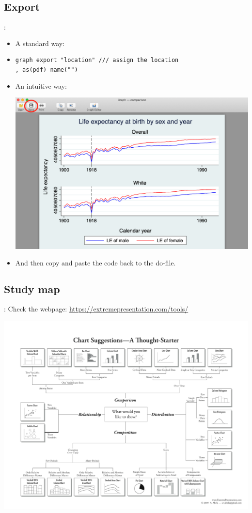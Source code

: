 \subsection{Export}
\begin{frame}[fragile]{\secname: \subsecname}
\begin{itemize}
	\item A standard way: 
	\item[] \begin{verbatim}
graph export "location" /// assign the location
, as(pdf) name("")	
 \end{verbatim}
	\item An intuitive way: \\
	\begin{center}
	\includegraphics[scale=0.15]{images/export}
\end{center}
\item And then copy and paste the code back to the do-file.
\end{itemize}

\end{frame}

\subsection{Study map}
\begin{frame}{\secname: \subsecname}
Check the webpage: \url{https://extremepresentation.com/tools/}

\begin{center}
	\includegraphics[scale=0.35]{images/chart}
\end{center}

\end{frame}



